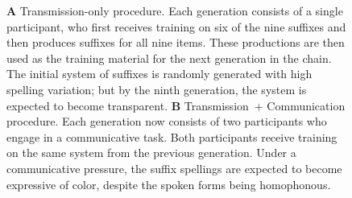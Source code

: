 \documentclass[doc,biblatex]{apa7}
\begin{document}
	\begin{figure}
	\vspace*{2pt}
	\caption{\textbf{A} Transmission-only procedure. Each generation consists of a single participant, who first receives training on six of the nine suffixes and then produces suffixes for all nine items. These productions are then used as the training material for the next generation in the chain. The initial system of suffixes is randomly generated with high spelling variation; but by the ninth generation, the system is expected to become transparent. \textbf{B} Transmission~+ Communication procedure. Each generation now consists of two participants who engage in a communicative task. Both participants receive training on the same system from the previous generation. Under a communicative pressure, the suffix spellings are expected to become expressive of color, despite the spoken forms being homophonous.}
	\label{transmission}
	\end{figure}
\end{document}
